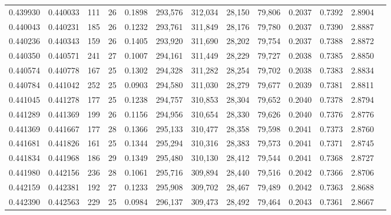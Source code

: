 \begin{tabular}{rrrrrrrrrrrrr}
0.439930 & 0.440033 &   111 &  26 &                                     0.1898 & 293,576 & 312,034 &  28,150 &  79,806 & 0.2037 & 0.7392 & 2.8904 \\
0.440043 & 0.440231 &   185 &  26 &                                     0.1232 & 293,761 & 311,849 &  28,176 &  79,780 & 0.2037 & 0.7390 & 2.8887 \\
0.440236 & 0.440343 &   159 &  26 &                                     0.1405 & 293,920 & 311,690 &  28,202 &  79,754 & 0.2037 & 0.7388 & 2.8872 \\
0.440350 & 0.440571 &   241 &  27 &                                     0.1007 & 294,161 & 311,449 &  28,229 &  79,727 & 0.2038 & 0.7385 & 2.8850 \\
0.440574 & 0.440778 &   167 &  25 &                                     0.1302 & 294,328 & 311,282 &  28,254 &  79,702 & 0.2038 & 0.7383 & 2.8834 \\
0.440784 & 0.441042 &   252 &  25 &                                     0.0903 & 294,580 & 311,030 &  28,279 &  79,677 & 0.2039 & 0.7381 & 2.8811 \\
0.441045 & 0.441278 &   177 &  25 &                                     0.1238 & 294,757 & 310,853 &  28,304 &  79,652 & 0.2040 & 0.7378 & 2.8794 \\
0.441289 & 0.441369 &   199 &  26 &                                     0.1156 & 294,956 & 310,654 &  28,330 &  79,626 & 0.2040 & 0.7376 & 2.8776 \\
0.441369 & 0.441667 &   177 &  28 &                                     0.1366 & 295,133 & 310,477 &  28,358 &  79,598 & 0.2041 & 0.7373 & 2.8760 \\
0.441681 & 0.441826 &   161 &  25 &                                     0.1344 & 295,294 & 310,316 &  28,383 &  79,573 & 0.2041 & 0.7371 & 2.8745 \\
0.441834 & 0.441968 &   186 &  29 &                                     0.1349 & 295,480 & 310,130 &  28,412 &  79,544 & 0.2041 & 0.7368 & 2.8727 \\
0.441980 & 0.442156 &   236 &  28 &                                     0.1061 & 295,716 & 309,894 &  28,440 &  79,516 & 0.2042 & 0.7366 & 2.8706 \\
0.442159 & 0.442381 &   192 &  27 &                                     0.1233 & 295,908 & 309,702 &  28,467 &  79,489 & 0.2042 & 0.7363 & 2.8688 \\
0.442390 & 0.442563 &   229 &  25 &                                     0.0984 & 296,137 & 309,473 &  28,492 &  79,464 & 0.2043 & 0.7361 & 2.8667 \\

\end{tabular}
